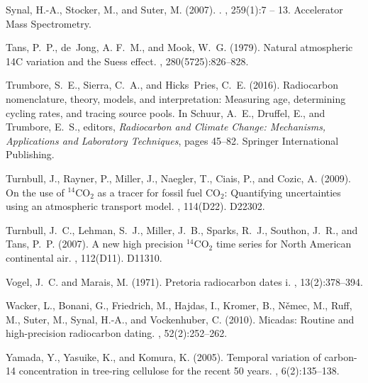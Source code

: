 \documentclass[a4paper, 11pt]{article}
\begin{document}
\begin{thebibliography}{}
Synal, H.-A., Stocker, M., and Suter, M. (2007).
.
, 259(1):7 -- 13.
\newblock Accelerator Mass Spectrometry.

Tans, P.~P., de~Jong, A. F.~M., and Mook, W.~G. (1979).
\newblock Natural atmospheric {14C} variation and the {Suess} effect.
, 280(5725):826--828.

Trumbore, S.~E., Sierra, C.~A., and Hicks~Pries, C.~E. (2016).
\newblock Radiocarbon nomenclature, theory, models, and interpretation:
  Measuring age, determining cycling rates, and tracing source pools.
\newblock In Schuur, A.~E., Druffel, E., and Trumbore, E.~S., editors, {\em
  Radiocarbon and Climate Change: Mechanisms, Applications and Laboratory
  Techniques}, pages 45--82. Springer International Publishing.

Turnbull, J., Rayner, P., Miller, J., Naegler, T., Ciais, P., and Cozic, A.
  (2009).
\newblock On the use of {$^{14}$CO$_2$} as a tracer for fossil fuel {CO$_2$}:
  Quantifying uncertainties using an atmospheric transport model.
, 114(D22).
\newblock D22302.

Turnbull, J.~C., Lehman, S.~J., Miller, J.~B., Sparks, R.~J., Southon, J.~R.,
  and Tans, P.~P. (2007).
\newblock A new high precision {$^{14}$CO$_2$} time series for {North American}
  continental air.
, 112(D11).
\newblock D11310.

Vogel, J.~C. and Marais, M. (1971).
\newblock Pretoria radiocarbon dates i.
, 13(2):378--394.

Wacker, L., Bonani, G., Friedrich, M., Hajdas, I., Kromer, B., N{\v e}mec, M.,
  Ruff, M., Suter, M., Synal, H.-A., and Vockenhuber, C. (2010).
\newblock Micadas: Routine and high-precision radiocarbon dating.
, 52(2):252--262.

Yamada, Y., Yasuike, K., and Komura, K. (2005).
\newblock Temporal variation of carbon-14 concentration in tree-ring cellulose
  for the recent 50 years.
, 6(2):135--138.

\end{thebibliography}
\end{document}
